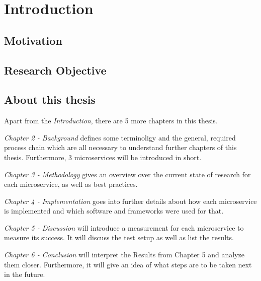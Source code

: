 \chapter{Introduction}


\section{Motivation}
\section{Research Objective}
\section{About this thesis}
Apart from the \emph{Introduction}, there are 5 more chapters in this thesis.

\emph{Chapter 2 - Background} defines some terminoligy and the general, required process chain which are all necessary to understand further chapters of this thesis. Furthermore, 3 microservices will be introduced in short.

\emph{Chapter 3 - Methodology} gives an overview over the current state of research for each microservice, as well as best practices. 

\emph{Chapter 4 - Implementation} goes into further details about how each microservice is implemented and which software and frameworks were used for that.

\emph{Chapter 5 - Discussion} will introduce a measurement for each microservice to measure its success. It will discuss the test setup as well as list the results.

\emph{Chapter 6 - Conclusion} will interpret the Results from Chapter 5 and analyze them closer. Furthermore, it will give an idea of what steps are to be taken next in the future.